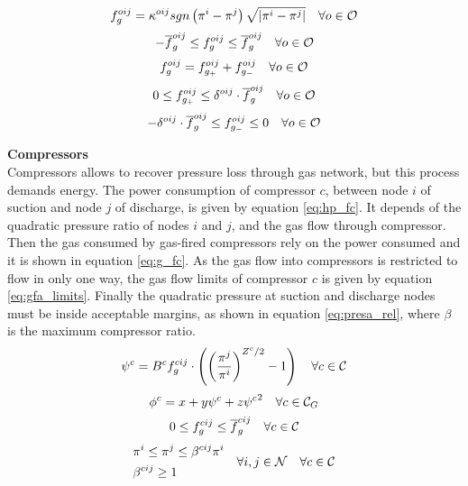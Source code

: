 \begin{equation}
{f}^{oij}_{g} = {{\kappa}^{oij}} sgn \left(\pi^{i}-\pi^{j}\right) {\sqrt{\left|\pi^{i}-\pi^{j}\right|}} \quad \forall o \in {\cal{O}}
\label{eq:wey}
\end{equation}
\begin{equation}
 - \overline{f}^{oij}_{g}  \le f^{oij}_{g} \le  \overline{f}^{oij}_{g}  \quad \forall o \in {\cal{O}}
\label{fgo_limits}
\end{equation}
\begin{equation}
{f}^{oij}_{g} =  f^{oij}_{g_+} + {f}^{oij}_{g_-} \quad \forall o \in {\cal{O}}
\label{eq:fgo}
\end{equation}
\begin{equation}
0 \le f^{oij}_{g_+} \le \delta^{oij} \cdot \overline{f}^{oij}_{g} \quad \forall o \in {\cal{O}}
\label{eq:fgopos_limits}
\end{equation}
\begin{equation}
- \delta^{oij} \cdot \overline{f}^{oij}_{g} \le f^{oij}_{g_-} \le 0 \quad \forall o \in {\cal{O}}
\label{eq:fgoneg_limits}
\end{equation}

\textbf{Compressors}\\

Compressors allows to recover pressure loss through gas network, but this process demands energy. The power consumption of compressor $c$, between node $i$ of suction and node $j$ of discharge, is given by equation \ref{eq:hp_fc}. It depends of the quadratic pressure ratio of nodes $i$ and $j$, and the gas flow through compressor. Then the gas consumed by gas-fired compressors rely on the power consumed and it is shown in equation \ref{eq:g_fc}. As the gas flow into compressors is restricted to flow in only one way, the gas flow limits of compressor $c$ is given by equation \ref{eq:gfa_limits}. Finally the quadratic pressure at suction and discharge nodes must be inside acceptable margins, as shown in equation \ref{eq:presa_rel}, where $\beta$ is the maximum compressor ratio.\\

\begin{equation}
\psi^{c} = {B^{c}}{f}^{cij}_{g} \cdot \left( {\left( \frac{\pi^{j}}{\pi^{i}} \right)}^{Z^{c} / 2} - 1 \right)   \quad \forall c \in {\cal{C}}
\label{eq:hp_fc}
\end{equation}
\begin{equation} 
{\phi}^{c} = x + y \psi^{c} +  z {\psi^{c}}^{2}  \quad \forall c \in {\cal{C}}_{G}
\label{eq:g_fc}
\end{equation}
\begin{equation}
0 \le {f}^{cij}_{g} \le \overline{f}^{cij}_{g}  \quad \forall c \in {\cal{C}}
\label{eq:gfa_limits}
\end{equation}
\begin{equation}
\begin{aligned}
&\pi^{i} \le \pi^{j} \le \beta^{cij} \pi^{i}\\
&\beta^{cij} \ge 1 \\
\end{aligned}
\quad \forall i,j \in {\cal{N}} \quad \forall c \in {\cal{C}}
\label{eq:presa_rel}
\end{equation}

